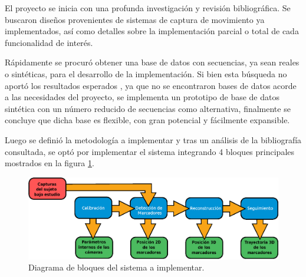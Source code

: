 \vspace{5 mm}

El proyecto se inicia con una profunda investigación y revisión bibliográfica. Se buscaron diseños provenientes de sistemas de captura de movimiento ya implementados, así como  detalles sobre la implementación parcial o total de cada funcionalidad de interés. 

Rápidamente se procuró obtener una base de datos con secuencias, ya sean reales o sintéticas, para el desarrollo de la implementación. Si bien esta búsqueda no aportó los resultados esperados
, ya que no se encontraron bases de datos acorde a las necesidades del proyecto, se implementa un prototipo de base de datos sintética con un número reducido de secuencias como alternativa, finalmente se concluye que dicha base es flexible, con gran potencial y fácilmente expansible.

 Luego se definió la metodología a implementar y tras un análisis de la bibliografía consultada, se optó por implementar el sistema integrando 4 bloques principales mostrados en la figura \ref{bloquesSistintro}. 

 \begin{figure}[H]
\begin{center}
\includegraphics[scale=0.8]{img/Sistema_completo/Diagrama_de_bloques.eps}
\end{center}
\caption{Diagrama de bloques del sistema a implementar.}
\label{bloquesSistintro}
\end{figure}

